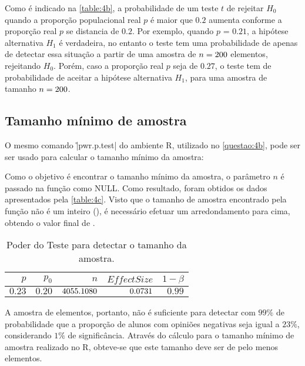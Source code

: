 	Como é indicado na \autoref{table:4b}, a probabilidade de um teste $t$ de rejeitar $H_0$ quando a proporção populacional real $p$ é maior que $0.2$ aumenta conforme a proporção real $p$ se distancia de $0.2$.
	Por exemplo, quando $p$ = $0.21$, a hipótese alternativa $H_1$ é verdadeira, no entanto
	o teste tem uma probabilidade de apenas \QUATROpVinteUmP de detectar essa situação a partir de uma
	amostra de $n=200$ elementos, rejeitando $H_0$. Porém, caso a proporção real $p$ seja de $0.27$,
	o teste tem \QUATROpVinteSeteP de probabilidade de aceitar a hipótese alternativa $H_1$, para uma amostra de tamanho $n = 200$.

\subsection{Tamanho mínimo de amostra}
\label{questao:4c}

	O mesmo comando \r|pwr.p.test| do ambiente R, utilizado no \autoref{questao:4b}, pode ser ser usado para calcular o tamanho mínimo da amostra: 


	Como o objetivo é encontrar o tamanho mínimo da amostra, o parâmetro
	$n$ é passado na função como NULL.
	Como resultado, foram obtidos os dados apresentados pela \autoref{table:4c}. 
	Visto que o tamanho de amostra encontrado pela função não é um inteiro
	(\QUATROtamanhoAmostra), é necessário efetuar um arredondamento para cima,
	obtendo o valor final de \QUATROtamanhoAmostraRounded.

	\begin{table}[ht]
	\centering
	\caption{Poder do Teste para detectar o tamanho da amostra.} 
	\label{table:4c}
	\begin{tabular}{rrrrr}
	  \toprule
		$p$ & $p_0$ & $n$ & $Effect Size$ & $1 - \beta$ \\ 
		\midrule
		$0.23$ & $0.20$ & $\num{4055.1080}$ & $\num{0.0731}$ & $0.99$ \\ 
		\bottomrule
	\end{tabular}
	\end{table}

	A amostra de \QUATROn elementos, portanto, não é suficiente para detectar com $99\%$ de probabilidade que a proporção	de alunos com opiniões negativas seja igual a $23\%$, considerando $1\%$ de significância.
	Através do cálculo para o tamanho mínimo de amostra realizado no R, 
	obteve-se que este tamanho deve ser de pelo menos \QUATROtamanhoAmostraRounded elementos.
